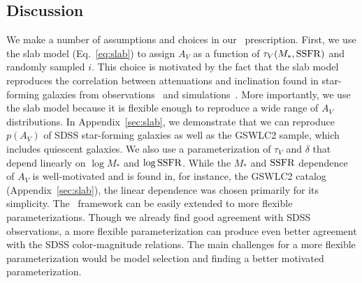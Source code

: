\subsection{Discussion}  
We make a number of assumptions and choices in our \eda~prescription. 
First, we use the slab model (Eq.~\ref{eq:slab}) to assign $A_V$ as a
function of $\tau_V(M_*, {\rm SSFR})$ and randomly sampled $i$. 
This choice is motivated by the fact that the slab model reproduces
the correlation between attenuations and inclination found in star-forming
galaxies from observations~\citep{conroy2010b, wild2011, battisti2017,
salim2020} and simulations~\citep[\eg][]{chevallard2013,
narayanan2018, trayford2020}.
More importantly, we use the slab model because it is flexible enough to
reproduce a wide range of $A_V$ distributions. 
In Appendix~\ref{sec:slab}, we demonstrate that we can reproduce $p(A_V)$ of
SDSS star-forming galaxies as well as the GSWLC2 sample, which includes
quiescent galaxies.
We also use a parameterization of $\tau_V$ and $\delta$ that
depend linearly on $\log M_*$ and $\log {\rm SSFR}$. 
While the $M_*$ and ${\rm SSFR}$ dependence of $A_V$ is well-motivated and is
found in, for instance, the \cite{salim2018} GSWLC2 catalog (Appendix~\ref{sec:slab}), 
the linear dependence was chosen primarily for its simplicity.
The \eda~framework can be easily extended to more flexible
parameterizations. 
Though we already find good agreement with SDSS observations, a more
flexible parameterization can produce
even better agreement with the SDSS color-magnitude relations. 
The main challenges for a more flexible parameterization would be model
selection and finding a better motivated parameterization. 

